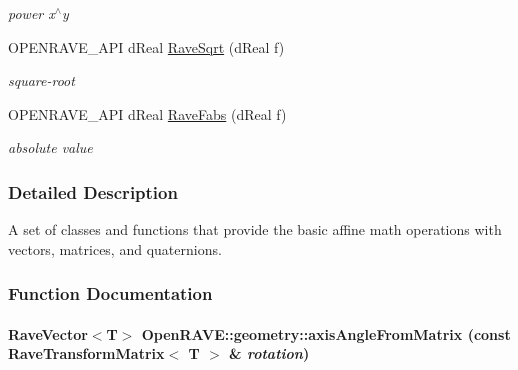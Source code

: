 \begin{DoxyCompactItemize}
\begin{DoxyCompactList}\small\item\em power x$^\wedge$y \item\end{DoxyCompactList}\item 
\hypertarget{group__affine__math_ga4fbefacd06b4565772517dae42e2cbcc}{
OPENRAVE\_\-API dReal \hyperlink{group__affine__math_ga4fbefacd06b4565772517dae42e2cbcc}{RaveSqrt} (dReal f)}
\label{group__affine__math_ga4fbefacd06b4565772517dae42e2cbcc}

\begin{DoxyCompactList}\small\item\em square-\/root \item\end{DoxyCompactList}\item 
\hypertarget{group__affine__math_ga3723ea5834c83fdbf64b9b9ad1d95cc6}{
OPENRAVE\_\-API dReal \hyperlink{group__affine__math_ga3723ea5834c83fdbf64b9b9ad1d95cc6}{RaveFabs} (dReal f)}
\label{group__affine__math_ga3723ea5834c83fdbf64b9b9ad1d95cc6}

\begin{DoxyCompactList}\small\item\em absolute value \item\end{DoxyCompactList}\end{DoxyCompactItemize}


\subsubsection{Detailed Description}
A set of classes and functions that provide the basic affine math operations with vectors, matrices, and quaternions. 

\subsubsection{Function Documentation}
\hypertarget{group__affine__math_gabf46823a4c5b59c9ac3e72f0905bea24}{
\paragraph[{axisAngleFromMatrix}]{\setlength{\rightskip}{0pt plus 5cm}RaveVector$<$T$>$ OpenRAVE::geometry::axisAngleFromMatrix (const RaveTransformMatrix$<$ T $>$ \& {\em rotation})}\hfill}
\label{group__affine__math_gabf46823a4c5b59c9ac3e72f0905bea24}


